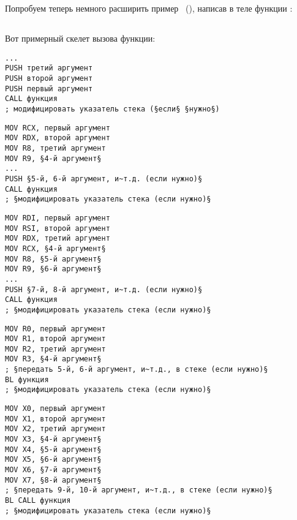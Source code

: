 \section{\PrintfSeveralArgumentsSectionName}

Попробуем теперь немного расширить пример \IT{\HelloWorldSectionName}~(),
написав в теле функции \main:







\subsection{\Conclusion{}}

Вот примерный скелет вызова функции:

\begin{lstlisting}[caption=x86]
...
PUSH третий аргумент
PUSH второй аргумент
PUSH первый аргумент
CALL функция
; модифицировать указатель стека (§если§ §нужно§)
\end{lstlisting}

\begin{lstlisting}[caption=x64 (MSVC)]
MOV RCX, первый аргумент
MOV RDX, второй аргумент
MOV R8, третий аргумент
MOV R9, §4-й аргумент§
...
PUSH §5-й, 6-й аргумент, и~т.д. (если нужно)§
CALL функция
; §модифицировать указатель стека (если нужно)§
\end{lstlisting}

\begin{lstlisting}[caption=x64 (GCC)]
MOV RDI, первый аргумент
MOV RSI, второй аргумент
MOV RDX, третий аргумент
MOV RCX, §4-й аргумент§
MOV R8, §5-й аргумент§
MOV R9, §6-й аргумент§
...
PUSH §7-й, 8-й аргумент, и~т.д. (если нужно)§
CALL функция
; §модифицировать указатель стека (если нужно)§
\end{lstlisting}

\begin{lstlisting}[caption=ARM]
MOV R0, первый аргумент
MOV R1, второй аргумент
MOV R2, третий аргумент
MOV R3, §4-й аргумент§
; §передать 5-й, 6-й аргумент, и~т.д., в стеке (если нужно)§
BL функция
; §модифицировать указатель стека (если нужно)§
\end{lstlisting}

\begin{lstlisting}[caption=ARM64]
MOV X0, первый аргумент
MOV X1, второй аргумент
MOV X2, третий аргумент
MOV X3, §4-й аргумент§
MOV X4, §5-й аргумент§
MOV X5, §6-й аргумент§
MOV X6, §7-й аргумент§
MOV X7, §8-й аргумент§
; §передать 9-й, 10-й аргумент, и~т.д., в стеке (если нужно)§
BL CALL функция
; §модифицировать указатель стека (если нужно)§
\end{lstlisting}

